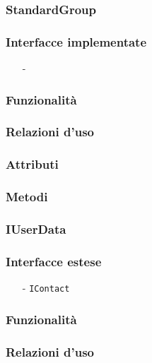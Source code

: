 \subsubsection{StandardGroup}\label{sec:standardgroup}

\subsubsection*{Interfacce implementate}
\begin{itemize}[noitemsep,nolistsep]
  \item[-]
\end{itemize}

\subsubsection*{Funzionalità}

\subsubsection*{Relazioni d'uso}

\subsubsection*{Attributi}

\subsubsection*{Metodi}

\subsubsection{IUserData}\label{sec:iuserdata}
\subsubsection*{Interfacce estese}
\begin{itemize}[noitemsep,nolistsep]
  \item[-] \texttt{IContact}
\end{itemize}

\subsubsection*{Funzionalità}
\subsubsection*{Relazioni d'uso}
